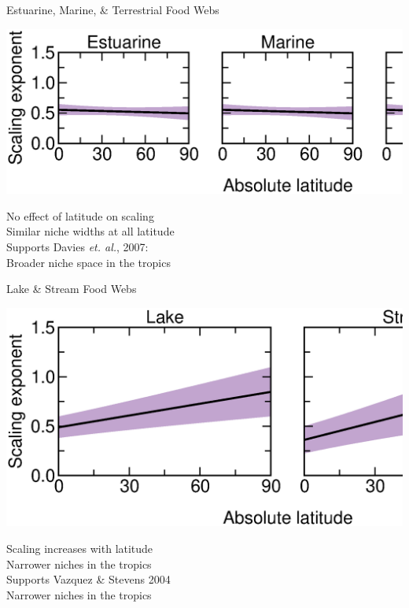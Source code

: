 \documentclass{beamer}
\begin{document}
  \begin{frame}{Estuarine, Marine, \& Terrestrial Food Webs}
    \begin{center}
      \includegraphics*[width=.9\textwidth]{Figures/results/no_effect.eps}

      \vspace{1cm}
      No effect of latitude on scaling\\
      Similar niche widths at all latitude\\
      \vspace{.54cm}      
      Supports Davies \emph{et. al.}, 2007:\\
      Broader niche space in the tropics

    \end{center}
  \end{frame}


  \begin{frame}{Lake \& Stream Food Webs}
    \begin{center}
      \includegraphics*[width=.75\textwidth]{Figures/results/effect.eps}

      \vspace{1cm}
      {\color{white} Scaling increases with latitude\\
      Narrower niches in the tropics\\
      \vspace{.54cm}      
      Supports Vazquez \& Stevens 2004\\}
      {\color{white} Narrower niches in the tropics}

    \end{center}
  \end{frame}
\end{document}
